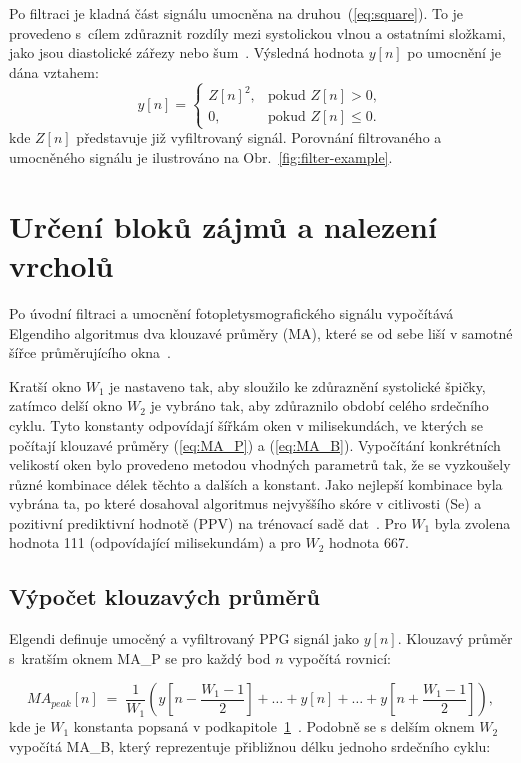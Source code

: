 Po filtraci je kladná část signálu umocněna na druhou~(\ref{eq:square}).
To je provedeno s~cílem zdůraznit rozdíly mezi systolickou vlnou a ostatními složkami, jako jsou diastolické zářezy nebo šum~\cite{Elgendi2013}.
Výsledná hodnota $y[n]$ po umocnění je dána vztahem:
\begin{equation}
	\label{eq:square}
		y[n] =
		\begin{cases}
			Z[n]^2, & \text{pokud } Z[n] > 0,\\[1mm]
			0, & \text{pokud } Z[n] \le 0.
		\end{cases}
	\end{equation}
kde $Z[n]$ představuje již vyfiltrovaný signál.
Porovnání filtrovaného a umocněného signálu je ilustrováno na Obr.~\ref{fig:filter-example}.

\section{Určení bloků zájmů a nalezení vrcholů}
\label{sec:thr_peaks}
% 
Po úvodní filtraci a umocnění fotopletysmografického signálu vypočítává Elgendiho algoritmus dva klouzavé průměry (\acs{MA}), které se od sebe liší v samotné šířce průměrujícího okna~\cite{Elgendi2013}.

Kratší okno \(W_1\) je nastaveno tak, aby sloužilo ke zdůraznění systolické špičky, zatímco delší okno \(W_2\) je vybráno tak, aby zdůraznilo období celého srdečního cyklu.
Tyto konstanty odpovídají šířkám oken v milisekundách, ve kterých se počítají klouzavé průměry (\ref{eq:MA_P}) a (\ref{eq:MA_B}).
Vypočítání konkrétních velikostí oken bylo provedeno metodou  vhodných parametrů tak, že se vyzkoušely různé kombinace délek těchto a dalších a konstant.
Jako nejlepší kombinace byla vybrána ta, po které dosahoval algoritmus nejvyššího skóre v citlivosti (\acs{Se}) a pozitivní prediktivní hodnotě (\acs{PPV}) na trénovací sadě dat~\cite{Elgendi2013}.
Pro \(W_1\) byla zvolena hodnota 111 (odpovídající milisekundám) a pro \(W_2\) hodnota 667.

\subsection*{Výpočet klouzavých průměrů} %
\label{sec:MA}
% 
Elgendi definuje umocěný a vyfiltrovaný \acs{PPG} signál jako \(y[n]\).
Klouzavý průměr s~kratším oknem \acs{MA_P} se pro každý bod \(n\) vypočítá rovnicí:

\begin{equation}
	MA_{peak}[n] \;=\;
	\frac{1}{W_1}
	(y[n - \frac{W_1-1}{2}] + \ldots + y[n] + \ldots + y[n + \frac{W_1-1}{2}]),
	\label{eq:MA_P}
\end{equation}
kde je \(W_1\) konstanta popsaná v podkapitole~\ref{sec:thr_peaks}~\cite{Elgendi2013}.
Podobně se s delším oknem \(W_2\) vypočítá \acs{MA_B}, který reprezentuje přibližnou délku jednoho srdečního cyklu:

